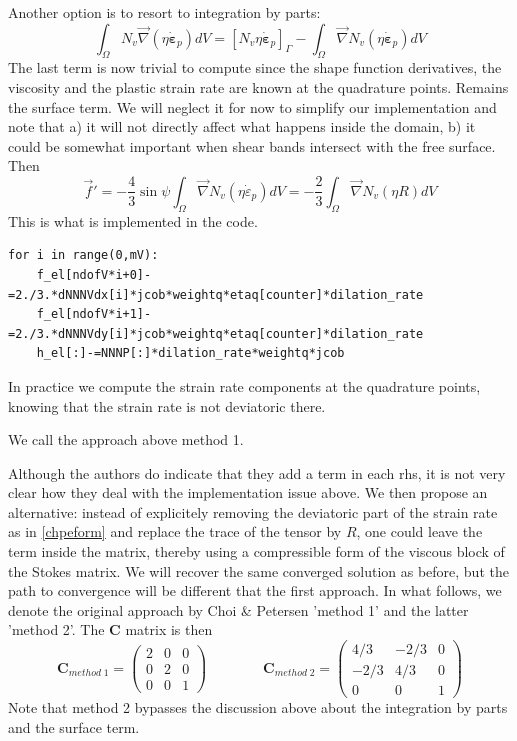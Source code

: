 Another option is to resort to integration by parts:
\begin{equation}
\int_\Omega N_v \vec\nabla(\eta \dot{\bm \varepsilon}_p) dV
= \left[ N_v \eta \dot{\bm \varepsilon}_p \right]_\Gamma 
-\int_\Omega \vec\nabla N_v (\eta \dot{\bm \varepsilon}_p) dV
\end{equation}
The last term is now trivial to compute since the shape function derivatives, the viscosity
and the plastic strain rate are known at the quadrature points. Remains the surface term. 
We will neglect it for now to simplify our implementation and note that a) it will not directly 
affect what happens inside the domain, b) it could be somewhat important when shear bands
intersect with the free surface. Then 
\begin{equation}
\vec f' 
=
-\frac{4}{3}\sin\psi\int_\Omega \vec\nabla N_v (\eta \dot{\varepsilon}_p) dV
=
-\frac{2}{3} \int_\Omega \vec\nabla N_v (\eta R) dV
\end{equation}
This is what is implemented in the code.
\begin{lstlisting}
for i in range(0,mV):
    f_el[ndofV*i+0]-=2./3.*dNNNVdx[i]*jcob*weightq*etaq[counter]*dilation_rate
    f_el[ndofV*i+1]-=2./3.*dNNNVdy[i]*jcob*weightq*etaq[counter]*dilation_rate
    h_el[:]-=NNNP[:]*dilation_rate*weightq*jcob
\end{lstlisting}
In practice we compute the strain rate components at the quadrature points, knowing that 
the strain rate is not deviatoric there.

We call the approach above method 1.

\vspace{0.5cm}

Although the authors do indicate that they add a term in each rhs, it is not very clear how they deal with
the implementation issue above. We then propose an alternative: instead of explicitely removing the deviatoric 
part of the strain rate as in \eqref{chpeform} and replace the trace of the tensor by $R$, one could 
leave the term inside the matrix, thereby using a compressible form of the viscous block of the Stokes 
matrix. We will recover the same converged solution as before, but the path to convergence will be 
different that the first approach.
In what follows, we denote the original approach by Choi \& Petersen 'method 1' and the latter 'method 2'.
The ${\bm C}$ matrix is then 
\[
{\bm C}_{method\; 1}
=
\left(
\begin{array}{ccc}
2 &0 &0 \\
0 &2 &0 \\
0 &0 &1
\end{array}
\right)
\qquad\qquad
{\bm C}_{method\; 2}
=
\left(
\begin{array}{ccc}
4/3 &-2/3 &0 \\
-2/3 & 4/3 &0 \\
0 &0 &1
\end{array}
\right)
\]
Note that method 2 bypasses the discussion above about the integration by parts and the surface term. 

